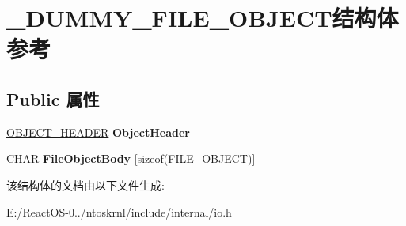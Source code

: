 \hypertarget{struct___d_u_m_m_y___f_i_l_e___o_b_j_e_c_t}{}\section{\+\_\+\+D\+U\+M\+M\+Y\+\_\+\+F\+I\+L\+E\+\_\+\+O\+B\+J\+E\+C\+T结构体 参考}
\label{struct___d_u_m_m_y___f_i_l_e___o_b_j_e_c_t}
\subsection*{Public 属性}
\begin{DoxyCompactItemize}
\item 
\mbox{\label{struct___d_u_m_m_y___f_i_l_e___o_b_j_e_c_t_adb3810d00f7f61cdadc9e28c4d2f06bd}} 
\hyperlink{struct___o_b_j_e_c_t___h_e_a_d_e_r}{O\+B\+J\+E\+C\+T\+\_\+\+H\+E\+A\+D\+ER} {\bfseries Object\+Header}
\item 
\mbox{\label{struct___d_u_m_m_y___f_i_l_e___o_b_j_e_c_t_abf637d70bef22f153f3deadd24b180ee}} 
C\+H\+AR {\bfseries File\+Object\+Body} \mbox{[}sizeof(F\+I\+L\+E\+\_\+\+O\+B\+J\+E\+CT)\mbox{]}
\end{DoxyCompactItemize}


该结构体的文档由以下文件生成\+:\begin{DoxyCompactItemize}
\item 
E\+:/\+React\+O\+S-\/0../ntoskrnl/include/internal/io.\+h\end{DoxyCompactItemize}
